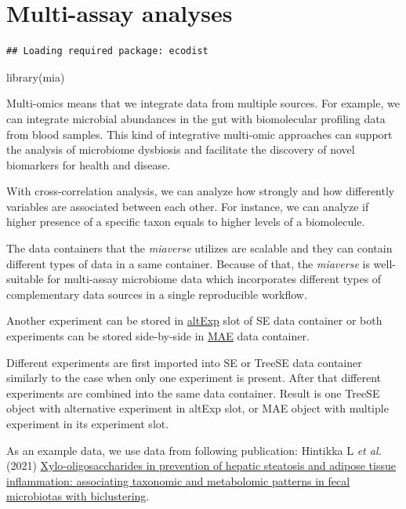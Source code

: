 \documentclass[
]{book}
\newenvironment{Shaded}{\begin{snugshade}}{\end{snugshade}}
\newcommand{\FunctionTok}[1]{\textcolor[rgb]{0.00,0.00,0.00}{#1}}
\newcommand{\NormalTok}[1]{#1}
\begin{document}
\hypertarget{multi-assay_analyses}{%
\chapter{Multi-assay analyses}\label{multi-assay_analyses}}

\begin{verbatim}
## Loading required package: ecodist
\end{verbatim}

\begin{Shaded}
\begin{Highlighting}[]
\FunctionTok{library}\NormalTok{(mia)}
\end{Highlighting}
\end{Shaded}

Multi-omics means that we integrate data from multiple sources. For example,
we can integrate microbial abundances in the gut with biomolecular profiling data
from blood samples. This kind of integrative multi-omic approaches can support the
analysis of microbiome dysbiosis and facilitate the discovery of novel biomarkers
for health and disease.

With cross-correlation analysis, we can analyze how strongly and how differently
variables are associated between each other. For instance, we can analyze if
higher presence of a specific taxon equals to higher levels of a biomolecule.

The data containers that the \emph{miaverse} utilizes are scalable and they can contain
different types of data in a same container. Because of that, the \emph{miaverse} is
well-suitable for multi-assay microbiome data which incorporates different types
of complementary data sources in a single reproducible workflow.

Another experiment can be stored in
\href{https://microbiome.github.io/OMA/containers.html\#alternative-experiments}{altExp}
slot of SE data container or both experiments can be stored side-by-side in
\href{https://microbiome.github.io/OMA/containers.html\#multiassayexperiments}{MAE}
data container.

Different experiments are first imported into SE or TreeSE data container similarly
to the case when only one experiment is present. After that different experiments are
combined into the same data container. Result is one TreeSE object with alternative
experiment in altExp slot, or MAE object with multiple experiment in its
experiment slot.

As an example data, we use data from following publication: Hintikka L \emph{et al.} (2021)
\href{https://doi.org/10.3390/ijerph18084049}{Xylo-oligosaccharides in prevention of hepatic steatosis and adipose tissue inflammation:
associating taxonomic and metabolomic patterns in fecal microbiotas with
biclustering}.
\end{document}
